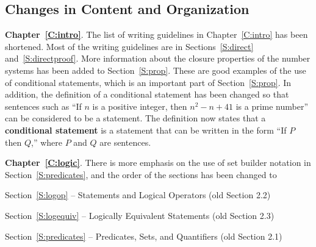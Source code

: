 \subsection*{Changes in Content and Organization}

\textbf{Chapter~\ref{C:intro}}.  The list of writing guidelines in Chapter~\ref{C:intro} has been shortened.  Most of the writing guidelines are in Sections~\ref{S:direct} 
and~\ref{S:directproof}.  More information about the closure properties of the number systems has been added to Section~\ref{S:prop}.  These are good examples of the use of conditional statements, which is an important part of Section~\ref{S:prop}.  In addition, the definition of a conditional statement has been changed so that sentences such as ``If $n$ is a positive integer, then $n^2 - n + 41$ is a prime number'' can be considered to be a statement.  The definition now states that a \textbf{conditional statement} is a statement that can be written in the form ``If $P$ then $Q$,'' where $P$ and $Q$ are sentences.
%
%

\vskip6pt
\noindent
\textbf{Chapter~\ref{C:logic}}.  There is more emphasis on the use of set builder notation in 
Section~\ref{S:predicates}, and the order of the sections has been changed to

Section~\ref{S:logop} -- Statements and Logical Operators (old Section 2.2)

Section~\ref{S:logequiv} -- Logically Equivalent Statements (old Section 2.3)

Section~\ref{S:predicates} -- Predicates, Sets, and Quantifiers (old Section 2.1)

